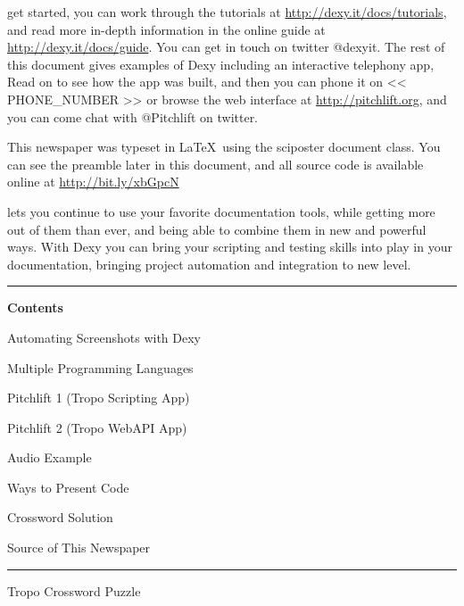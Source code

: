 \documentclass[custom, plainsections]{sciposter}
\begin{document}
\begin{multicols*}{3}
 get started, you can work through the tutorials at \href{http://bit.ly/zj8iAj}{http://dexy.it/docs/tutorials}, and read more in-depth information in the online guide at \href{http://bit.ly/xloDcF}{http://dexy.it/docs/guide}. You can get in touch on twitter @dexyit. The rest of this document gives examples of Dexy including an interactive telephony app, Read on to see how the app was built, and then you can phone it on << PHONE_NUMBER >> or browse the web interface at \href{http://bit.ly/xOt1qs}{http://pitchlift.org}, and you can come chat with @Pitchlift on twitter.

This newspaper was typeset in \LaTeX~using the sciposter document class. You can see the preamble later in this document, and all source code is available online at \href{http://bit.ly/xbGpcN}{http://bit.ly/xbGpcN}

\vspace{5cm}

 lets you continue to use your favorite documentation tools, while getting more out of them than ever, and being able to combine them in new and powerful ways. With Dexy you can bring your scripting and testing skills into play in your documentation, bringing project automation and integration to new level.

\vspace{0.5cm}
\hrule
\vspace{0.2cm}

\textbf{Contents}

Automating Screenshots with Dexy \dotfill \pageref{sec:automating-screenshots}

Multiple Programming Languages \dotfill \pageref{sec:multiple-languages}

Pitchlift 1 (Tropo Scripting App) \dotfill \pageref{sec:pitchlift-1}

Pitchlift 2 (Tropo WebAPI App) \dotfill \pageref{sec:pitchlift-2}

Audio Example \dotfill \pageref{sec:audio-example}

Ways to Present Code \dotfill \pageref{sec:present-code}

Crossword Solution \dotfill \pageref{sec:solution}

Source of This Newspaper \dotfill \pageref{sec:source}

\vspace{0.4cm}
\hrule
\vspace{0.4cm}

\large
Tropo Crossword Puzzle
\small


\end{multicols*}
\end{document}
